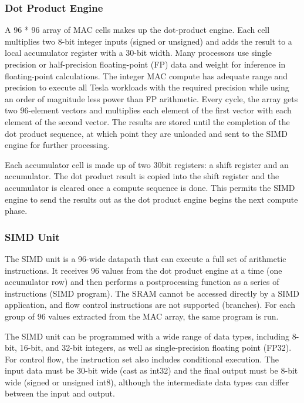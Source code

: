 \documentclass[letterpaper, 10 pt, conference]{ieeeconf}  %
\begin{document}
\subsubsection{Dot Product Engine}
A 96 * 96 array of MAC cells makes up the dot-product engine. Each cell multiplies two 8-bit integer inputs (signed or unsigned) and adds the result to a local accumulator register with a 30-bit width. Many processors use single precision or half-precision floating-point (FP) data and weight for inference in floating-point calculations. The integer MAC compute has adequate range and precision to execute all Tesla workloads with the required precision while using an order of magnitude less power than FP arithmetic. Every cycle, the array gets two 96-element vectors and multiplies each element of the first vector with each element of the second vector. The results are stored until the completion of the dot product sequence, at which point they are unloaded and sent to the SIMD engine for further processing.

Each accumulator cell is made up of two 30bit registers: a shift register and an accumulator. The dot product result is copied into the shift register and the accumulator is cleared once a compute sequence is done. This permits the SIMD engine to send the results out as the dot product engine begins the next compute phase.

\subsubsection{SIMD Unit}
The SIMD unit is a 96-wide datapath that can execute a full set of arithmetic instructions. It receives 96 values from the dot product engine at a time (one accumulator row) and then performs a postprocessing function as a series of instructions (SIMD program). The SRAM cannot be accessed directly by a SIMD application, and flow control instructions are not supported (branches). For each group of 96 values extracted from the MAC array, the same program is run\cite{10.1145/1133255.1133997}.

The SIMD unit can be programmed with a wide range of data types, including 8-bit, 16-bit, and 32-bit integers, as well as single-precision floating point (FP32). For control flow, the instruction set also includes conditional execution. The input data must be 30-bit wide (cast as int32) and the final output must be 8-bit wide (signed or unsigned int8), although the intermediate data types can differ between the input and output.
\end{document}
